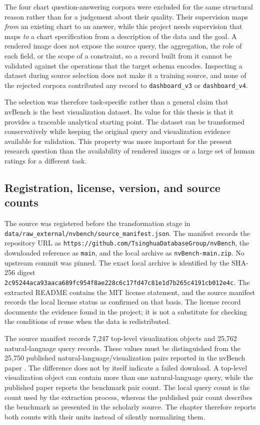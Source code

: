 The four chart question-answering corpora were excluded for the same structural reason rather than for a judgement about their quality. Their supervision maps \emph{from} an existing chart to an answer, while this project needs supervision that maps \emph{to} a chart specification from a description of the data and the goal. A rendered image does not expose the source query, the aggregation, the role of each field, or the scope of a constraint, so a record built from it cannot be validated against the operations that the target schema encodes. Inspecting a dataset during source selection does not make it a training source, and none of the rejected corpora contributed any record to \texttt{dashboard\_v3} or \texttt{dashboard\_v4}.

The selection was therefore task-specific rather than a general claim that nvBench is the best visualization dataset. Its value for this thesis is that it provides a traceable analytical starting point. The dataset can be transformed conservatively while keeping the original query and visualization evidence available for validation. This property was more important for the present research question than the availability of rendered images or a large set of human ratings for a different task.

\subsection{Registration, license, version, and source counts}

The source was registered before the transformation stage in \nolinkurl{data/raw_external/nvbench/source_manifest.json}. The manifest records the repository URL as \nolinkurl{https://github.com/TsinghuaDatabaseGroup/nvBench}, the downloaded reference as \texttt{main}, and the local archive as \texttt{nvBench-main.zip}. No upstream commit was pinned. The exact local archive is identified by the SHA-256 digest \nolinkurl{2c95244aca93aaca689fc954f8ae228c6c17fd47c81e1d7b265c4191cb012e4c}. The extracted README contains the MIT license statement, and the source manifest records the local license status as confirmed on that basis. The license record documents the evidence found in the project; it is not a substitute for checking the conditions of reuse when the data is redistributed.

The source manifest records 7,247 top-level visualization objects and 25,762 natural-language query records. These values must be distinguished from the 25,750 published natural-language/visualization pairs reported in the nvBench paper \cite{luo2021nvbenchdataset}. The difference does not by itself indicate a failed download. A top-level visualization object can contain more than one natural-language query, while the published paper reports the benchmark pair count. The local query count is the count used by the extraction process, whereas the published pair count describes the benchmark as presented in the scholarly source. The chapter therefore reports both counts with their units instead of silently normalizing them.

